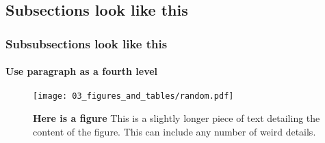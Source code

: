 \subsection{Subsections look like this}
\subsubsection{Subsubsections look like this}
\paragraph{Use paragraph as a fourth level}

\blindtext 

\begin{SCfigure}[][h]
     \texttt{[image: 03\_figures\_and\_tables/random.pdf]}
    \caption[This will be the figures name in the list of figures]{\textbf{Here is a figure} This is a slightly longer piece of text detailing the content of the figure. This can include any number of weird details.}  
    \label{test}
\end{SCfigure}

\blindtext 
